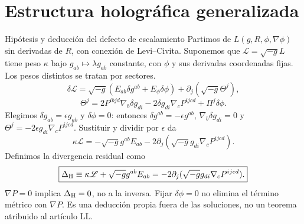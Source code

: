 \section{Estructura holográfica generalizada}
\setcounter{holografiaSavedEquation}{\value{equation}}
\begingroup
\setcounter{equation}{0}
\renewcommand{\theequation}{G\arabic{equation}}
\renewcommand{\theHequation}{holografia-gen.\arabic{equation}}
\begin{frame}[label=holo-gen-01]{Hipótesis y deducción del defecto de escalamiento}
\hypertarget{holo-gen-04}{}
\footnotesize\CompactDisplaySpacing
Partimos de $L(g,R,\phi,\nabla\phi)$ sin derivadas de $R$, con conexión de Levi--Civita. Suponemos que $\mathscr L=\sqrt{-g}L$ tiene peso $\kappa$ bajo $g_{ab}\mapsto\lambda g_{ab}$ constante, con $\phi$ y sus derivadas coordenadas fijas. Los pesos distintos se tratan por sectores.
\[
\delta\mathscr L=\sqrt{-g}(E_{ab}\delta g^{ab}+E_\phi\delta\phi)
+\partial_j(\sqrt{-g}\Theta^j),
\]
\begin{equation}
\Theta^j=2P^{ibjd}\nabla_b\delta g_{di}-2\delta g_{di}\nabla_cP^{ijcd}+\Pi^j\delta\phi.
\label{eq:hg-boundary}
\end{equation}
Elegimos $\delta g_{ab}=\epsilon g_{ab}$ y $\delta\phi=0$: entonces $\delta g^{ab}=-\epsilon g^{ab}$, $\nabla_b\delta g_{di}=0$ y $\Theta^j=-2\epsilon g_{di}\nabla_cP^{ijcd}$. Sustituir y dividir por $\epsilon$ da
\[
\kappa\mathscr L=-\sqrt{-g}g^{ab}E_{ab}-2\partial_j(\sqrt{-g}g_{di}\nabla_cP^{ijcd}).
\]
Definimos la divergencia residual como
\begin{equation}
\boxed{\Delta_{\rm H}\equiv\kappa\mathscr L+\sqrt{-g}g^{ab}E_{ab}
=-2\partial_j(\sqrt{-g}g_{di}\nabla_cP^{ijcd}).}
\label{eq:hg-defect}
\end{equation}
$\nabla P=0$ implica $\Delta_{\rm H}=0$, no a la inversa. Fijar $\delta\phi=0$ no elimina el término métrico con $\nabla P$. Es una deducción propia fuera de las soluciones, no un teorema atribuido al artículo LL.
\end{frame}
